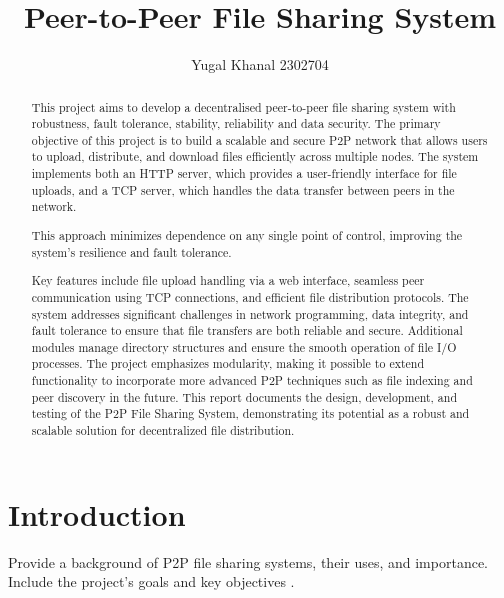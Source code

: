 \documentclass[12pt,a4paper]{report}
\title{Peer-to-Peer File Sharing System}
\author{Yugal Khanal 2302704}
\date{}
\begin{document}
\maketitle

\begin{abstract}
	This project aims to develop a decentralised peer-to-peer file sharing system with robustness, fault tolerance, stability, reliability and data security. The primary objective of this project is to build a scalable and secure P2P network that allows users to upload, distribute, and download files efficiently across multiple nodes. The system implements both an HTTP server, which provides a user-friendly interface for file uploads, and a TCP server, which handles the data transfer between peers in the network.

	This approach minimizes dependence on any single point of control, improving the system’s resilience and fault tolerance.

	\vspace{3.5mm}Key features include file upload handling via a web interface, seamless peer communication using TCP connections, and efficient file distribution protocols. The system addresses significant challenges in network programming, data integrity, and fault tolerance to ensure that file transfers are both reliable and secure. Additional modules manage directory structures and ensure the smooth operation of file I/O processes. The project emphasizes modularity, making it possible to extend functionality to incorporate more advanced P2P techniques such as file indexing and peer discovery in the future. This report documents the design, development, and testing of the P2P File Sharing System, demonstrating its potential as a robust and scalable solution for decentralized file distribution.
\end{abstract}

\tableofcontents
\newpage

\chapter{Introduction}
Provide a background of P2P file sharing systems, their uses, and importance. Include the project’s goals and key objectives .
\end{document}
